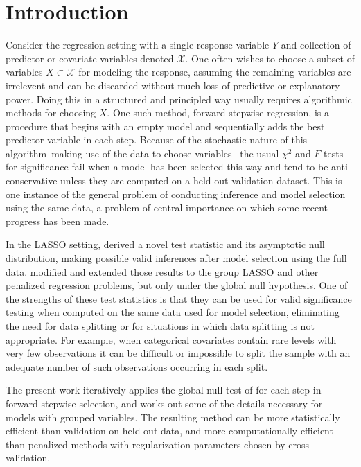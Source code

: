 \documentclass{imsart}
\begin{document}
\section{Introduction}
\label{sec:intro}

Consider the regression setting with a single response variable $Y$
and collection of predictor or covariate variables denoted $\mathcal X$.
One often wishes to choose a subset of variables $X \subset \mathcal X$
for modeling the response, assuming the remaining variables are
irrelevent and can be discarded without much loss of predictive
or explanatory power. Doing this in a structured and principled way
usually requires algorithmic methods for choosing $X$. One such method,
forward stepwise regression, is a procedure
that begins with an empty model and sequentially adds the best predictor
variable in each step. Because of the stochastic nature of this
algorithm--making use of the data to choose variables--
the usual $\chi^2$ and $F$-tests for significance
fail when a model has been selected this way and tend to be
anti-conservative unless they are computed on a held-out validation
dataset. This is one instance of the general problem of conducting
inference and model selection using the same data, a problem
of central importance on which some recent progress has been made.

In the LASSO setting, \cite{significance:lasso} derived
a novel test statistic and its asymptotic null distribution, making
possible valid inferences after model selection using the full data.
\cite{tests:adaptive} modified and extended those results to the
group LASSO \citep{grouplasso} and other penalized regression
problems, but only under the global null hypothesis.
One of the strengths of these test statistics is that they can be
used for valid significance testing when computed on the same
data used for model selection, eliminating the need for data splitting
or for situations in which data splitting is not appropriate. For example,
when categorical covariates contain rare levels with very few observations
it can be difficult or impossible to split the sample with an adequate
number of such observations occurring in each split.

The present work iteratively applies the global null test
of \cite{tests:adaptive} for each step in forward stepwise selection,
and works out some of the details necessary for
models with grouped variables. The resulting method can
be more statistically efficient than validation on held-out data, and
more computationally efficient than penalized methods with
regularization parameters chosen by cross-validation.
\end{document}
